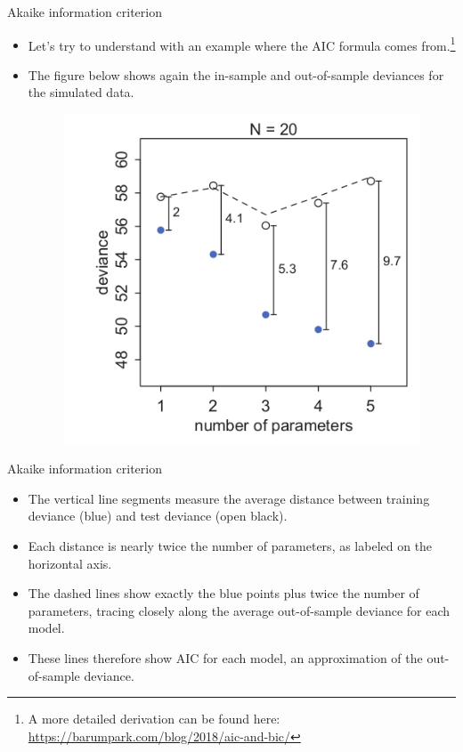 \documentclass[handout]{beamer}
\begin{document}
\begin{frame}{Akaike information criterion}
\scriptsize{

\begin{itemize}
\item Let's try to understand with an example where the AIC formula comes from.\footnote{A more detailed derivation can be found here: \url{https://barumpark.com/blog/2018/aic-and-bic/}}

\item The figure below shows again the in-sample and out-of-sample deviances for the simulated data.

\begin{figure}[h!]
	\centering
	\includegraphics[scale=0.33]{pics/akaike.png}
\end{figure}


\end{itemize}


} 
\end{frame}

\begin{frame}{Akaike information criterion}
\scriptsize{

\begin{itemize}

\item The vertical line segments measure the average distance between training deviance (blue) and test
deviance (open black).

\item Each distance is nearly twice the number of parameters, as labeled on the horizontal axis. 

\item The dashed lines show exactly the blue points plus
twice the number of parameters, tracing closely along the average out-of-sample deviance for each model.

\item These lines therefore show AIC for each model, an approximation of the out-of-sample deviance.


\end{itemize}


} 
\end{frame}
\end{document}

